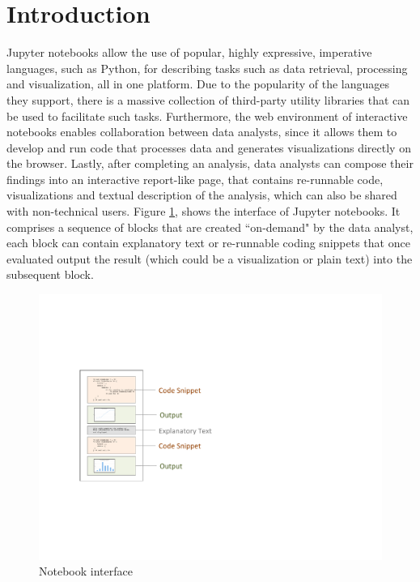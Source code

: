 \section{Introduction}
\label{section:introduction}





Jupyter notebooks \cite{Jupyter} allow the use of popular, highly expressive, imperative languages, such as Python, for describing tasks such as data retrieval, processing and visualization, all in one platform. Due to the popularity of the languages they support, there is a massive collection of third-party utility libraries that can be used to facilitate such tasks. Furthermore, the web environment of interactive notebooks enables collaboration between data analysts, since it allows them to develop and run code that processes data and generates visualizations directly on the browser. Lastly, after completing an analysis, data analysts can compose their findings into an interactive report-like page, that contains re-runnable code, visualizations and textual description of the analysis, which can also be shared with non-technical users. Figure \ref{figure:notebook-interface}, shows the interface of Jupyter notebooks. It comprises a sequence of blocks that are created ``on-demand" by the data analyst, each block can contain explanatory text or re-runnable coding snippets that once evaluated output the result (which could be a visualization or plain text) into the subsequent block. 
\begin{figure}[t]
	\centering
	\includegraphics[width=0.7\columnwidth]{figures/notebook2.pdf}
	\caption{Notebook interface}
	\label{figure:notebook-interface}
\end{figure}

